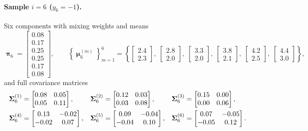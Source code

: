 \documentclass[11pt, letterpaper]{article}
\newcommand{\bSigma}{\vb{\Sigma}}
\newcommand{\bpi}{\boldsymbol{\uppi}}
\newcommand{\bmu}{\boldsymbol{\upmu}}
\begin{document}
\paragraph{Sample $i = 6$ ($y_6 = -1$).} Six components with mixing weights and means
\begin{equation}
    \bpi_6 = \begin{bmatrix} 0.08 \\ 0.17 \\ 0.25 \\ 0.25 \\ 0.17 \\ 0.08 \end{bmatrix},
    \qquad
    \left\{\bmu_6^{(m)}\right\}_{m=1}^{6} =
    \left\{
        \begin{bmatrix} 2.4 \\ 2.3 \end{bmatrix},\;
        \begin{bmatrix} 2.8 \\ 2.0 \end{bmatrix},\;
        \begin{bmatrix} 3.3 \\ 2.0 \end{bmatrix},\;
        \begin{bmatrix} 3.8 \\ 2.1 \end{bmatrix},\;
        \begin{bmatrix} 4.2 \\ 2.5 \end{bmatrix},\;
        \begin{bmatrix} 4.4 \\ 3.0 \end{bmatrix}
    \right\},
\end{equation}
and full covariance matrices
\begin{align}
    \bSigma_6^{(1)} &= \begin{bmatrix} 0.08 & 0.05 \\ 0.05 & 0.11 \end{bmatrix}, &
    \bSigma_6^{(2)} &= \begin{bmatrix} 0.12 & 0.03 \\ 0.03 & 0.08 \end{bmatrix}, &
    \bSigma_6^{(3)} &= \begin{bmatrix} 0.15 & 0.00 \\ 0.00 & 0.06 \end{bmatrix}, \notag \\
    \bSigma_6^{(4)} &= \begin{bmatrix} 0.13 & -0.02 \\ -0.02 & 0.07 \end{bmatrix}, &
    \bSigma_6^{(5)} &= \begin{bmatrix} 0.09 & -0.04 \\ -0.04 & 0.10 \end{bmatrix}, &
    \bSigma_6^{(6)} &= \begin{bmatrix} 0.07 & -0.05 \\ -0.05 & 0.12 \end{bmatrix}.
\end{align}
\end{document}
